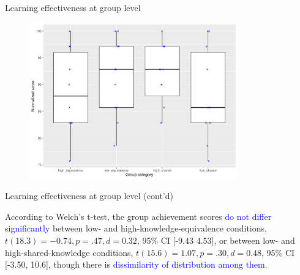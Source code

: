 \begin{frame}{Learning effectiveness at group level}
    
    \begin{figure}[tb]
     \begin{center}
      \includegraphics[width=90mm]{images/rqb_group-map-redraw.pdf}
      \end{center}
      \label{rqb::group-map}  
    \end{figure}
\end{frame}



\begin{frame}{Learning effectiveness at group level (cont'd)}

    {\small According to Welch's t-test, the group achievement scores \textcolor{blue}{do not differ significantly} between low- and high-knowledge-equivalence conditions, $t(18.3) = -0.74, p = .47, d = 0.32$, 95\% CI [-9.43  4.53], or between low- and high-shared-knowledge conditions, $t(15.6) = 1.07, p = .30, d = 0.48$, 95\% CI [-3.50, 10.6], though there is \textcolor{blue}{dissimilarity of distribution among them}.}
\end{frame}


